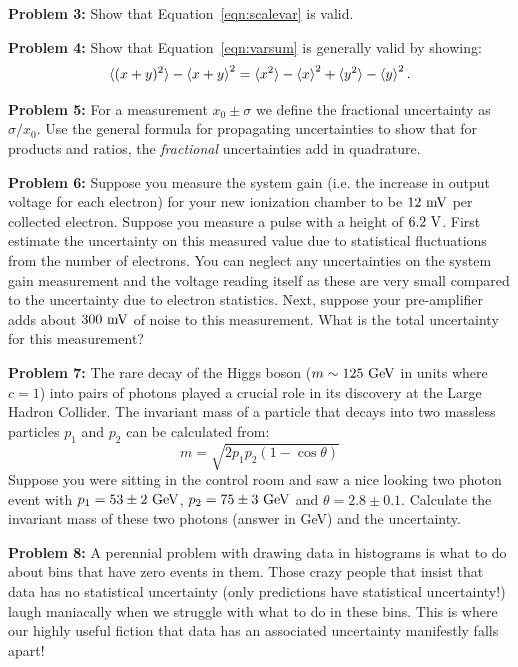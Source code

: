 \documentclass[12pt,oneside]{book}
\begin{document}
\noindent
{\bf Problem 3:}  Show that Equation~\ref{eqn:scalevar} is valid. \\ \vskip 0.25cm

\noindent
{\bf Problem 4:}  Show that Equation~\ref{eqn:varsum} is generally valid by showing:
\begin{displaymath}
\braket{(x+y)^2} - \braket{x+y}^2 = \braket{x^2} - \braket{x}^2 + \braket{y^2} - \braket{y}^2.
\end{displaymath}
\vskip 0.25cm

\noindent
{\bf Problem 5:}  For a measurement $x_0 \pm \sigma$ we define the fractional uncertainty as $\sigma/x_0$.  Use the general formula for propagating uncertainties to show that for products and ratios, the {\em fractional} uncertainties add in quadrature.  \\ \vskip 0.25cm

\noindent
{\bf Problem 6:}  Suppose you measure the system gain (i.e. the increase
in output voltage for each electron) for your new ionization chamber
to be $12~\rm mV$ per collected electron.  Suppose you measure a pulse
with a height of $6.2~\rm V$.  First estimate the uncertainty on this
measured value due to statistical fluctuations from the number of
electrons.  You can neglect any uncertainties on the system gain
measurement and the voltage reading itself as these are very small
compared to the uncertainty due to electron statistics.  Next, suppose
your pre-amplifier adds about $300~\rm mV$ of noise to this
measurement.  What is the total uncertainty for this measurement?
\\ \vskip 0.25cm

\noindent
{\bf Problem 7:}  The rare decay of the Higgs boson ($m \sim125~\rm GeV$ in units where $c=1$) into pairs of photons played a crucial role in its discovery at the Large Hadron Collider.  The invariant mass of a particle that decays into two massless particles $p_1$ and $p_2$ can be calculated from:
\begin{displaymath}
m = \sqrt{2  p_1 p_2 (1 - \cos\theta)}
\end{displaymath}
Suppose you were sitting in the control room and saw a nice looking two photon event with 
$p_1=53 \pm 2~\rm GeV$, $p_2=75 \pm 3~\rm GeV$ and $\theta = 2.8 \pm 0.1$.   Calculate the invariant mass of these two photons (answer in GeV) and the uncertainty. \\ \vskip 0.25cm

\noindent
{\bf Problem 8:} A perennial problem with drawing data in histograms
is what to do about bins that have zero events in them.  Those crazy
people that insist that data has no statistical uncertainty (only
predictions have statistical uncertainty!) laugh maniacally when we
struggle with what to do in these bins.  This is where our highly
useful fiction that data has an associated uncertainty manifestly
falls apart!
\end{document}
